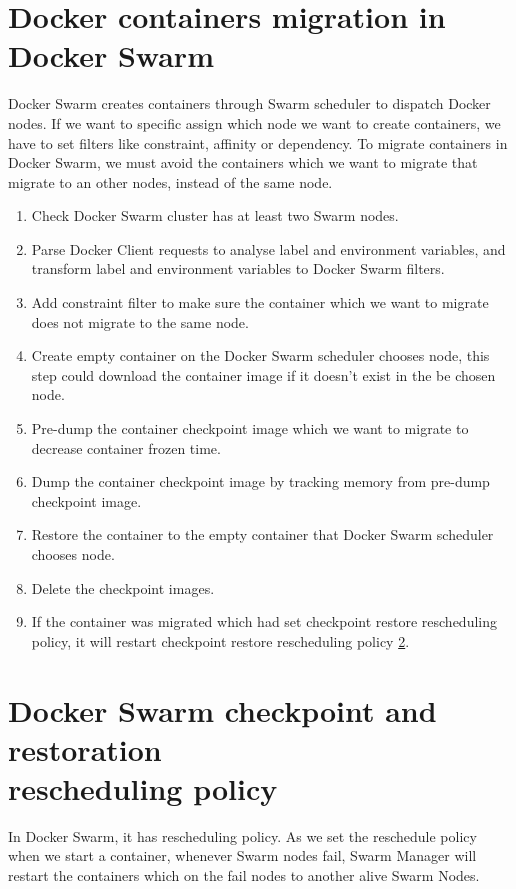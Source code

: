 \section{Docker containers migration in Docker Swarm}
Docker Swarm creates containers through Swarm scheduler to dispatch Docker nodes. If we want to specific assign which node we want to create containers, we have to set filters like constraint, affinity or dependency.
To migrate containers in Docker Swarm, we must avoid the containers which we want to migrate that migrate to an other nodes, instead of the same node.
\begin{enumerate}[Step 1.]
	\item Check Docker Swarm cluster has at least two Swarm nodes.
    \item Parse Docker Client requests to analyse label and environment variables, and transform label and environment variables to Docker Swarm filters.
    \item Add constraint filter to make sure the container which we want to migrate does not migrate to the same node.
    \item Create empty container on the Docker Swarm scheduler chooses node, this step could download the container image if it doesn't exist in the be chosen node.
    \item Pre-dump the container checkpoint image which we want to migrate to decrease container frozen time.
    \item Dump the container checkpoint image by tracking memory from pre-dump checkpoint image.
    \item Restore the container to the empty container that Docker Swarm scheduler chooses node.
    \item Delete the checkpoint images.
    \item If the container was migrated which had set checkpoint restore rescheduling policy, it will restart checkpoint restore rescheduling policy \ref{sec:checkpoint restore rescheduling policy}.
\end{enumerate}

\section{Docker Swarm checkpoint and restoration \\rescheduling policy}
\label{sec:checkpoint restore rescheduling policy}
In Docker Swarm, it has rescheduling policy. As we set the reschedule policy when we start a container, whenever Swarm nodes fail, Swarm Manager will restart the containers which on the fail nodes to another alive Swarm Nodes.

